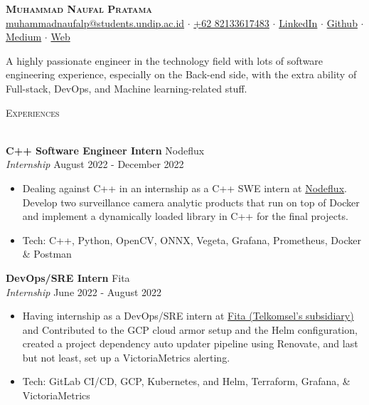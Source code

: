 \documentclass[a4paper]{article}
\newcommand{\lineunder} {
    \vspace*{-8pt} \\
    \hspace*{-18pt} \hrulefill \\
}
\newcommand{\header} [1] {
    {\hspace*{-18pt}\vspace*{6pt} \textsc{#1}}
    \vspace*{-6pt} \lineunder
}
\begin{document}
\vspace*{-40pt}

\vspace*{-10pt}
\begin{center}
	{\Huge \scshape \textbf{Muhammad Naufal Pratama}}\\
	\href{mailto:muhammadnaufalp@students.undip.ac.id}{muhammadnaufalp@students.undip.ac.id} $\cdot$ \href{https://wa.me/6282133617483}{+62 82133617483} $\cdot$ \href{https://linkedin.com/in/mnpratamaa}{LinkedIn} $\cdot$ \href{https://github.com/mhnaufal}{Github} $\cdot$ \href{https://medium.com/@mprtmma}{Medium} $\cdot$ \href{https://mhnaufal.github.io/}{Web}\\
\end{center}

A highly passionate engineer in the technology field with lots of software engineering experience, especially on the Back-end side, with the extra ability of Full-stack, DevOps, and Machine learning-related stuff.\\
\hfill \break

\header{Experiences}
\vspace{1mm}

\textbf{C++ Software Engineer Intern} \hfill Nodeflux\\
\textit{Internship} \hfill August 2022 - December 2022\\
\vspace{-1mm}
\begin{itemize} \itemsep 1pt
	\item Dealing against C++ in an internship as a C++ SWE intern at \href{https://www.nodeflux.io/}{Nodeflux}. Develop two surveillance camera analytic products that run on top of Docker and implement a dynamically loaded library in C++ for the final projects.
	\item Tech: C++, Python, OpenCV, ONNX, Vegeta, Grafana, Prometheus, Docker \& Postman
\end{itemize}

\textbf{DevOps/SRE Intern} \hfill Fita\\
\textit{Internship} \hfill June 2022 - August 2022\\
\vspace{-1mm}
\begin{itemize} \itemsep 1pt
	\item Having internship as a DevOps/SRE intern at \href{https://fita.co.id/}{Fita (Telkomsel's subsidiary)} and Contributed to the GCP cloud armor setup and the Helm configuration, created a project dependency auto updater pipeline using Renovate, and last but not least, set up a VictoriaMetrics alerting.
	\item Tech: GitLab CI/CD, GCP, Kubernetes, and Helm, Terraform, Grafana, \& VictoriaMetrics
\end{itemize}
\end{document}
